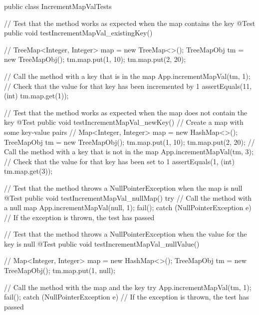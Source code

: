 \documentclass[a4paper]{article}
\begin{document}
    \hspace{-1.7cm}\begin{verbbox}[]
 public class IncrementMapValTests {
  // Test that the method works as expected when the map contains the key
  @Test
  public void testIncrementMapVal_existingKey() {
    // TreeMap<Integer, Integer> map = new TreeMap<>();
    TreeMapObj tm = new TreeMapObj();
    tm.map.put(1, 10);
    tm.map.put(2, 20);

   // Call the method with a key that is in the map
    App.incrementMapVal(tm, 1);
   // Check that the value for that key has been incremented by 1
    assertEquals(11, (int) tm.map.get(1));
  }

  // Test that the method works as expected when the map does not contain the key
  @Test
  public void testIncrementMapVal_newKey() {
  // Create a map with some key-value pairs
    // Map<Integer, Integer> map = new HashMap<>();
    TreeMapObj tm = new TreeMapObj();
    tm.map.put(1, 10);
    tm.map.put(2, 20);
    // Call the method with a key that is not in the map
    App.incrementMapVal(tm, 3);
    // Check that the value for that key has been set to 1
    assertEquals(1, (int) tm.map.get(3));
  }

    // Test that the method throws a NullPointerException when the map is null
  @Test
  public void testIncrementMapVal_nullMap() {
    try {
    // Call the method with a null map
      App.incrementMapVal(null, 1);
      fail();
    } catch (NullPointerException e) {
    // If the exception is thrown, the test has passed
    }
  }

    // Test that the method throws a NullPointerException when the value for the key is null
  @Test
  public void testIncrementMapVal_nullValue() {
    // Map<Integer, Integer> map = new HashMap<>();
    TreeMapObj tm = new TreeMapObj();
    tm.map.put(1, null);

    // Call the method with the map and the key
    try {
      App.incrementMapVal(tm, 1);
      fail();
    } catch (NullPointerException e) {
    // If the exception is thrown, the test has passed
    }
  }
}
   \end{verbbox}
   \theverbbox
\end{document}

